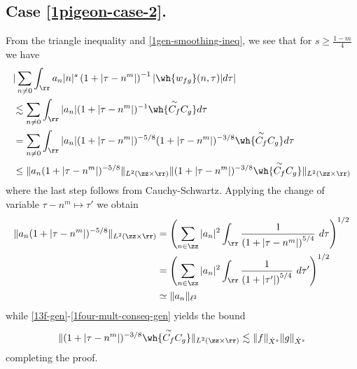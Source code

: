 \subsection{Case \eqref{1pigeon-case-2}.} From the triangle inequality and
\eqref{1gen-smoothing-ineq}, we see that for $s \ge \frac{1-m}{4}$ we have
%
%
%
%
%
%
\begin{equation}
	\begin{split}
		& | \sum_{n \neq 0} \int_{\rr} a_n |n|^s \left( 1 + | \tau - n^m | \right)^{-1} | 
		\wh{w_{fg}}(n, \tau) | d \tau |
		\\
		& \lesssim \sum_{n \neq 0}  \int_{\rr} |a_{n}| (1+ | \tau - n^m |)^{-1} \wh{\overset{\sim}{C_f} C_g} d
		\tau
	\\	
	& = \sum_{n \neq 0} \int_{\rr} |a_{n}| (1+ | \tau - n^m |)^{-5/8} (1 + | \tau - n^m
	|)^{-3/8} \wh{\overset{\sim}{C_f} C_g} d
		\tau
		\\
		& \le \|a_{n} (1 + | \tau - n^m |)^{-5/8}\|_{L^2(\zz \times \rr)}  \| (1 +
		| \tau - n^m |)^{-3/8} \wh{\overset{\sim}{C_f} C_g}  \|_{L^2(\zz \times
		\rr)}
		\end{split}
\end{equation}
%
%
where the last step follows from Cauchy-Schwartz. Applying the change of
variable $\tau - n^{m } \mapsto \tau'$ we obtain  %
\begin{equation*}
	\begin{split}
		\|a_{n} (1 + | \tau - n^m |)^{-5/8}\|_{L^2(\zz \times \rr)} 
		& = \left( \sum_{n \in \zz} | a_{n} |^2\int_{\rr} \frac{1}{\left( 1 + | \tau -
		n^{m } | \right)^{5/4}} \ d \tau  
		\right)^{1/2} 
		\\
		& = \left ( \sum_{n \in \zz}
		| a_n |^2 
		\int_{\rr} \frac{1}{\left( 1 + | \tau' | \right)^{5/4}} \ d 
		\tau' \right)^{1/2}
		\\
		& \simeq \|a_n\|_{\ell^2}
		\end{split}
\end{equation*}
%
%
%
while \eqref{13f-gen}-\eqref{1four-mult-conseq-gen} yields the bound
%
%
\begin{equation*}
	\begin{split}
	\| (1 + | \tau - n^m |)^{-3/8} \wh{\overset{\sim}{C_f} C_g}  \|_{L^2(\zz
	\times \rr)} \lesssim \|f\|_{\dot{X}^s} \|g\|_{\dot{X}^s}
	\end{split}
\end{equation*}
%
%
completing the proof. \qquad \qedsymbol
%
%
